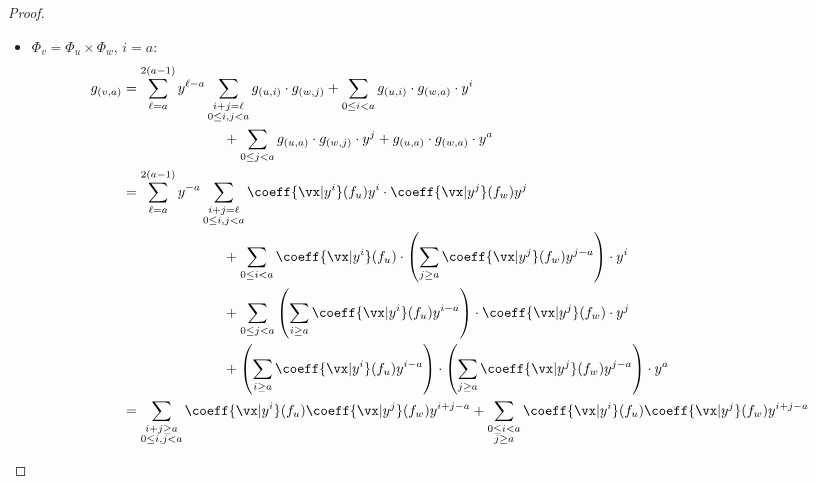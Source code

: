 \documentclass[11pt]{article}
\numberwithin{equation}{section}
\theoremstyle{definition}
\theoremstyle{plain}
\begin{document}
\begin{proof}
\begin{subproof}
\begin{itemize}
\begin{align*}
                                        &=\sum_{0\le j\le i} \coeff{\vx|y^{j}}(f_u) \cdot \coeff{\vx|y^{i-j}}(f_w)\\
                                        &=\coeff{\vx|y^i}(f_u\cdot f_w)
                                        =\coeff{\vx|y^i}(f_v)
                                        \;.
                                \end{align*}
                        \item $\Phi_v=\Phi_u\times\Phi_w$, $i=a$:
                                \begin{align*}
                                        g_{(v,a)}
                                        &=\sum_{\ell=a}^{2(a-1)}y^{\ell-a}\sum_{\substack{i+j=\ell\\0\le i,j< a}}g_{(u,i)}\cdot g_{(w,j)}
                                                + \sum_{0\le i<a} g_{(u,i)}\cdot g_{(w,a)}\cdot y^i\\
                                        &\hspace{1in}+ \sum_{0\le j<a} g_{(u,a)}\cdot g_{(w,j)}\cdot y^j
                                                +g_{(u,a)}\cdot g_{(w,a)}\cdot y^a\\
                                        &=\sum_{\ell=a}^{2(a-1)}y^{-a}\sum_{\substack{i+j=\ell\\0\le i,j< a}}\coeff{\vx|y^i}(f_u)y^i\cdot \coeff{\vx|y^j}(f_w)y^j\\
                                        &\hspace{1in}+ \sum_{0\le i<a} \coeff{\vx|y^i}(f_u)\cdot \left (\sum_{j\ge a}\coeff{\vx|y^j}(f_w)y^{j-a}\right)\cdot y^i\\
                                        &\hspace{1in}+ \sum_{0\le j<a} \left(\sum_{i\ge a}\coeff{\vx|y^i}(f_u)y^{i-a}\right)\cdot \coeff{\vx|y^j}(f_w)\cdot y^j\\
                                        &\hspace{1in}+\left(\sum_{i\ge a}\coeff{\vx|y^i}(f_u)y^{i-a}\right)\cdot \left (\sum_{j\ge a}\coeff{\vx|y^j}(f_w)y^{j-a}\right)\cdot y^a\\
                                        &=\sum_{\substack{i+j\ge a\\0\le i,j<a}}\coeff{\vx|y^i}(f_u)\coeff{\vx|y^j}(f_w) y^{i+j-a}
                                                +\sum_{\substack{0\le i<a\\ j\ge a}}\coeff{\vx|y^i}(f_u)\coeff{\vx|y^j}(f_w) y^{i+j-a}\\

\end{align*}
\end{itemize}
\end{subproof}
\end{proof}
\end{document}
